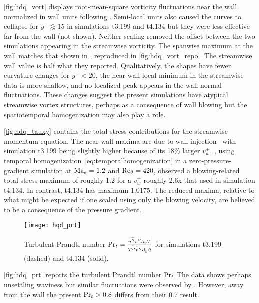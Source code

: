\autoref{fig:hdq_vort} displays root-mean-square vorticity fluctuations near the
wall normalized in wall units following \citet{Guarini2000Direct}.  Semi-local
units also caused the curves
to collapse for $y^{+}\lessapprox{}15$
in simulations t3.199 and t4.134
but they were less effective far from the wall (not shown).
Neither scaling removed the offset between the two simulations appearing in the
streamwise vorticity.  The spanwise maximum at the wall matches that shown in
\citet{Guarini2000Direct}, reproduced in \autoref{fig:hdq_vort_repo}.
The streamwise wall value is half what they
reported.  Qualitatively, the shapes have fewer curvature changes for
$y^{+}<20$, the near-wall local minimum in the streamwise data is more shallow,
and no localized peak appears in the wall-normal fluctuations.
These changes suggest the present simulations have atypical streamwise
vortex structures, perhaps as a consequence of wall blowing but the
spatiotemporal homogenization may also play a role.

\autoref{fig:hdq_tauxy} contains the total stress contributions for the streamwise
momentum equation.  The near-wall maxima are due to wall
injection~\citep{Sumitani1995Direct} with simulation t3.199 being slightly
higher because of its 18\% larger $v_w^{+}$.  \citet{Topalian2014Temporal},
using temporal homogenization~\eqref{eq:temporalhomogenization} in a
zero-pressure-gradient simulation at $\Mach[e]{}=1.2$ and
$\Reynolds[\theta]{}=420$, observed a blowing-related total stress maximum of
roughly 1.2 for a $v_w^{+}$ roughly
2.6x that used in simulation t4.134.  In contrast, t4.134 has maximum 1.0175.
The reduced maxima, relative to what might be expected if one scaled using only the blowing velocity,
are believed to be a consequence of the pressure gradient.

\begin{figure}
\centering
\texttt{[image: hqd\_prt]}
\caption[Turbulent Prandtl number in simulations t3.199 and t4.134]{%
    Turbulent Prandtl number $\Prandtl[t]{} =
    \frac{\widetilde{u^{\prime\prime}v^{\prime\prime}}\partial_y\tilde{T}}
         {\widetilde{T^{\prime\prime}v^{\prime\prime}}\partial_y\tilde{u}}$
    for simulations t3.199 (dashed) and t4.134 (solid).\label{fig:hdq_prt}
}
\end{figure}

\autoref{fig:hdq_prt} reports the turbulent Prandtl number $\Prandtl[t]{}$ The
data shows perhaps unsettling waviness but similar fluctuations were observed
by \citet[Figure 14]{Guarini2000Direct}.  However, away from the wall the
present $\Prandtl[t]{}>0.8$ differs from their 0.7 result.

